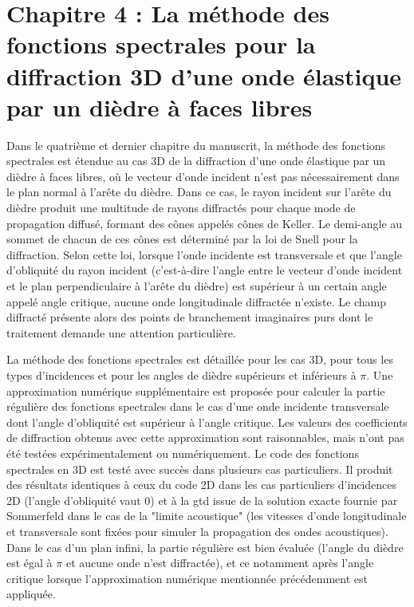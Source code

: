 \section[Résumé du chapitre 4]{Chapitre 4 : La méthode des fonctions spectrales pour la diffraction 3D d'une onde élastique par un dièdre à faces libres}

\hspace{2em}Dans le quatrième et dernier chapitre du manuscrit, la méthode des fonctions spectrales est étendue au cas 3D de la diffraction d'une onde élastique par un dièdre à faces libres, où le vecteur d'onde incident n'est pas nécessairement dans le plan normal à l'arête du dièdre. Dans ce cas, le rayon incident sur l'arête du dièdre produit une multitude de rayons diffractés pour chaque mode de propagation diffusé, formant des cônes appelés cônes de Keller. Le demi-angle au sommet de chacun de ces cônes est déterminé par la loi de Snell pour la diffraction. Selon cette loi, lorsque l'onde incidente est transversale et que l'angle d'obliquité du rayon incident (c'est-à-dire l'angle entre le vecteur d'onde incident et le plan perpendiculaire à l'arête du dièdre) est supérieur à un certain angle appelé angle critique, aucune onde longitudinale diffractée n'existe. Le champ diffracté présente alors des points de branchement imaginaires purs dont le traitement demande une attention particulière. 

La méthode des fonctions spectrales est détaillée pour les cas 3D, pour tous les types d'incidences et pour les angles de dièdre supérieurs et inférieurs à $\pi$. Une approximation numérique supplémentaire est proposée pour calculer la partie régulière des fonctions spectrales dans le cas d'une onde incidente transversale dont l'angle d'obliquité est supérieur à l'angle critique. Les valeurs des coefficients de diffraction obtenus avec cette approximation sont raisonnables, mais n'ont pas été testées expérimentalement ou numériquement. Le code des fonctions spectrales en 3D est testé avec succès dans plusieurs cas particuliers. Il produit des résultats identiques à ceux du code 2D dans les cas particuliers d'incidences 2D (l'angle d'obliquité vaut $0$) et à la \acrshort{gtd} issue de la solution exacte fournie par Sommerfeld dans le cas de la "limite acoustique" (les vitesses d'onde longitudinale et transversale sont fixées pour simuler la propagation des ondes acoustiques). Dans le cas d'un plan infini, la partie régulière est bien évaluée (l'angle du dièdre est égal à $\pi$ et aucune onde n'est diffractée), et ce notamment après l'angle critique lorsque l'approximation numérique mentionnée précédemment est appliquée.

